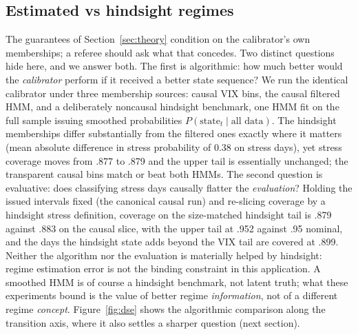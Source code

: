 \subsection{Estimated vs hindsight regimes}\label{sec:oracle}

The guarantees of Section~\ref{sec:theory} condition on the calibrator's
own memberships; a referee should ask what that concedes. Two distinct
questions hide here, and we answer both. The first is algorithmic: how
much better would the \emph{calibrator} perform if it received a better
state sequence? We run the identical calibrator under three membership
sources: causal VIX bins, the causal filtered HMM, and a deliberately
noncausal hindsight benchmark, one HMM fit on the full sample issuing
smoothed probabilities $P(\text{state}_t \mid \text{all data})$. The
hindsight memberships differ substantially from the filtered ones exactly
where it matters (mean absolute difference in stress probability of 0.38
on stress days), yet stress coverage moves from .877 to .879 and the
upper tail is essentially unchanged; the transparent causal bins match or
beat both HMMs. The second question is evaluative: does classifying
stress days causally flatter the \emph{evaluation}? Holding the issued
intervals fixed (the canonical causal run) and re-slicing coverage by a
hindsight stress definition, coverage on the size-matched hindsight tail
is .879 against .883 on the causal slice, with the upper tail at .952
against .95 nominal, and the days the hindsight state adds beyond the
VIX tail are covered at .899. Neither the algorithm nor the evaluation
is materially helped by hindsight: regime estimation error is not the
binding constraint in this application. A smoothed HMM is of course a
hindsight benchmark, not latent truth; what these experiments bound is
the value of better regime \emph{information}, not of a different regime
\emph{concept}. Figure~\ref{fig:dse} shows the algorithmic comparison
along the transition axis, where it also settles a sharper question
(next section).
